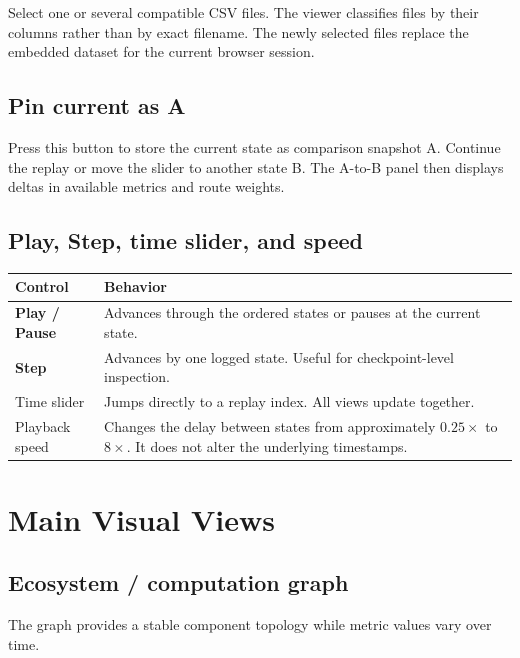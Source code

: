 \documentclass[11pt,a4paper]{article}
\newcommand{\ui}[1]{\textsf{\bfseries #1}}
\begin{document}
Select one or several compatible CSV files. The viewer classifies files by their columns rather than by exact filename. The newly selected files replace the embedded dataset for the current browser session.

\subsection{Pin current as A}

Press this button to store the current state as comparison snapshot A. Continue the replay or move the slider to another state B. The A-to-B panel then displays deltas in available metrics and route weights.

\subsection{Play, Step, time slider, and speed}

\begin{table}[h]
\centering
\begin{tabularx}{\textwidth}{@{}P{37mm}Y@{}}
\toprule
\textbf{Control} & \textbf{Behavior}\\
\midrule
\ui{Play / Pause} & Advances through the ordered states or pauses at the current state.\\
\ui{Step} & Advances by one logged state. Useful for checkpoint-level inspection.\\
Time slider & Jumps directly to a replay index. All views update together.\\
Playback speed & Changes the delay between states from approximately $0.25\times$ to $8\times$. It does not alter the underlying timestamps.\\
\bottomrule
\end{tabularx}
\end{table}

\section{Main Visual Views}

\subsection{Ecosystem / computation graph}

The graph provides a stable component topology while metric values vary over time.
\end{document}
